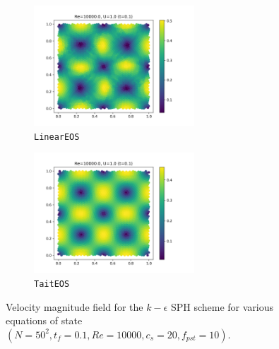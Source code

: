 \begin{figure}[H]
  \begin{subfigure}{7cm}
    \centering\includegraphics[width=6cm]{Code-Figures/keps/eos/c0_20_linear_pec_dtmul_1_nx_50_pst_10_re_10000_k_eps/final_vmag.png}
    \caption{\texttt{LinearEOS}}
  \end{subfigure}
  \begin{subfigure}{7cm}
    \centering\includegraphics[width=6cm]{Code-Figures/keps/eos/c0_20_tait_pec_dtmul_1_nx_50_pst_10_re_10000_k_eps/final_vmag.png}
    \caption{\texttt{TaitEOS}}
  \end{subfigure}
  \caption{Velocity magnitude field for the $k-\epsilon$ SPH scheme for various equations of state $(N=50^2, t_f=0.1, Re=10000, c_s=20, f_{pst}=10)$.}
  \label{fig:keps-eos-vmag}
\end{figure}

